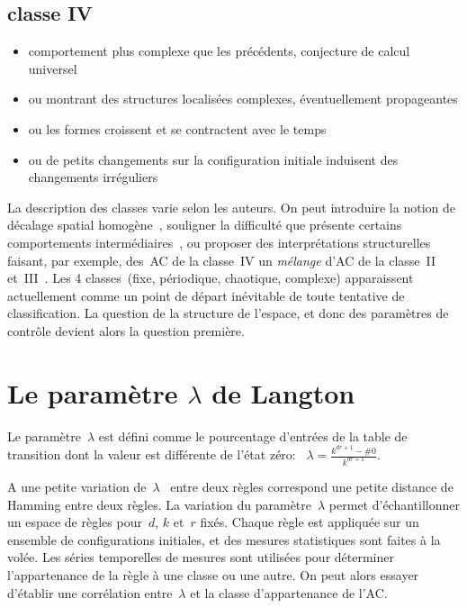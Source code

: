 \subsection*{classe IV}

\begin{itemize}
\item comportement plus complexe que les pr\'ec\'edents, conjecture de
  calcul universel
\item ou montrant des structures localis\'ees complexes,
  \'eventuellement propageantes
\item ou les formes croissent et se contractent avec le temps
\item ou de petits changements sur la configuration initiale
  induisent des changements irr\'eguliers
\end{itemize}

La description des classes varie selon les auteurs. %
On peut introduire la notion de d\'ecalage spatial
homog\`ene~\cite[]{Li90b}, %
souligner la difficult\'e que pr\'esente certains comportements
interm\'ediaires~\cite[]{McIntosh90}, %
ou proposer des interpr\'etations structurelles faisant, par exemple,
des~AC de la classe~IV un \emph{m\'elange} d'AC de la classe~II
et~III~\cite[]{Kayama93}. %
Les 4 classes~(fixe, p\'eriodique, chaotique, complexe) apparaissent
actuellement comme un point de d\'epart in\'evitable de toute tentative de
classification. %
La question de la structure de l'espace, et donc des param\`etres de
contr\^ole devient alors la question premi\`ere.

\section{Le param\`etre $\lambda$ de Langton}
\label{ref-lambda}

Le param\`etre~$\lambda$ est d\'efini comme le pourcentage d'entr\'ees de la
table de transition dont la valeur est diff\'erente de l'\'etat z\'ero:~%
$\lambda = \frac{k^{dr+1}-\#0}{k^{dr+1}}$. %

A une petite variation de~$\lambda$~\cite[]{Langton92b} entre deux
r\`egles correspond une petite distance de Hamming entre deux r\`egles. %
La variation du param\`etre~$\lambda$ permet d'\'echantillonner
un espace de r\`egles pour~$d$, $k$ et~$r$ fix\'es. %
Chaque r\`egle est appliqu\'ee sur un ensemble de configurations
initiales, et des mesures statistiques sont faites \`a la vol\'ee. %
Les s\'eries temporelles de mesures sont utilis\'ees pour d\'eterminer
l'appartenance de la r\`egle \`a une classe ou une autre. %
On peut alors essayer d'\'etablir une corr\'elation entre~$\lambda$
et la classe d'appartenance de l'AC. %

